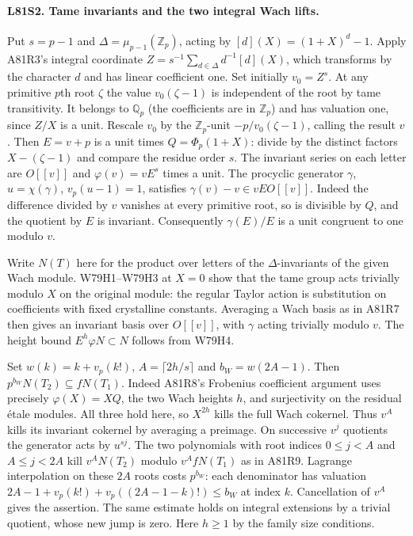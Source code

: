 \paragraph{L81S2. Tame invariants and the two integral Wach lifts.}
Put $s=p-1$ and $\Delta=\mu_{p-1}(\mathbb Z_p)$, acting by
$[d](X)=(1+X)^d-1$. Apply A81R3's integral coordinate
$Z=s^{-1}\sum_{d\in\Delta}d^{-1}[d](X)$, which transforms by
the character $d$ and has linear coefficient one. Set initially
$v_0=Z^s$. At any primitive $p$th root $\zeta$ the value
$v_0(\zeta-1)$ is independent of the root by tame transitivity.
It belongs to $\mathbb Q_p$ (the coefficients are in $\mathbb Z_p$)
and has valuation one, since $Z/X$ is a unit. Rescale $v_0$ by
the $\mathbb Z_p$-unit $-p/v_0(\zeta-1)$, calling the result $v$.
Then $E=v+p$ is a unit times $Q=\Phi_p(1+X)$: divide by the
distinct factors $X-(\zeta-1)$ and compare the residue order $s$.
The invariant series on each letter are $O[[v]]$ and
$\varphi(v)=vE^s$ times a unit. The procyclic generator $\gamma$,
$u=\chi(\gamma)$, $v_p(u-1)=1$, satisfies $\gamma(v)-v\in vE O[[v]]$.
Indeed the difference divided by $v$ vanishes at every primitive
root, so is divisible by $Q$, and the quotient by $E$ is invariant.
Consequently $\gamma(E)/E$ is a unit congruent to one modulo $v$.

Write $N(T)$ here for the product over letters of the
$\Delta$-invariants of the given Wach module. W79H1--W79H3
at $X=0$ show that the tame group acts trivially modulo $X$
on the original module: the regular Taylor action is substitution
on coefficients with fixed crystalline constants. Averaging a
Wach basis as in A81R7 then gives an invariant basis over
$O[[v]]$, with $\gamma$ acting trivially modulo $v$.
The height bound $E^h\varphi N\subset N$ follows from W79H4.

Set $w(k)=k+v_p(k!)$, $A=\lceil2h/s\rceil$ and
$b_W=w(2A-1)$. Then $p^{b_W}N(T_2)\subseteq fN(T_1)$.
Indeed A81R8's Frobenius coefficient argument uses precisely
$\varphi(X)=XQ$, the two Wach heights $h$, and surjectivity on
the residual \'etale modules. All three hold here, so $X^{2h}$
kills the full Wach cokernel. Thus $v^A$ kills its invariant
cokernel by averaging a preimage. On successive $v^j$ quotients
the generator acts by $u^{sj}$. The two polynomials with root
indices $0\le j<A$ and $A\le j<2A$ kill $v^A N(T_2)$
modulo $v^A fN(T_1)$ as in A81R9. Lagrange interpolation on
these $2A$ roots costs $p^{b_W}$: each denominator has valuation
$2A-1+v_p(k!)+v_p((2A-1-k)!)\le b_W$ at index $k$.
Cancellation of $v^A$ gives the assertion. The same estimate
holds on integral extensions by a trivial quotient, whose new
jump is zero. Here $h\ge1$ by the family size conditions.

